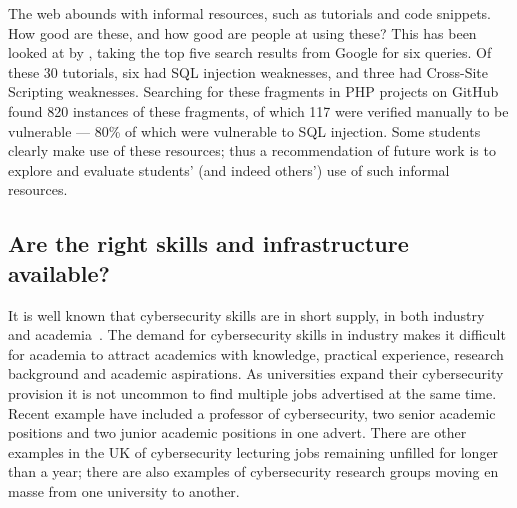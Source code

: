 \documentclass[sigconf]{acmart}
\begin{document}
The web abounds with informal resources, such as tutorials and code snippets. How good are these, and how good are people at using these? This has been looked at by \cite{Unruhetal2017a}, taking the top five search results from Google for six queries. Of these 30 tutorials, six had SQL injection weaknesses, and three had Cross-Site Scripting weaknesses. Searching for these fragments in PHP projects on GitHub found 820 instances of these fragments, of which 117 were verified manually to be vulnerable --- 80\% of which were vulnerable to SQL injection. Some students clearly make use of these resources; thus a recommendation of future work is to explore and evaluate students' (and indeed others') use of such informal resources. 

\subsection{Are the right skills and infrastructure available?}
It is well known that cybersecurity skills are in short supply, in both industry~\cite{Ackerman2019a} and academia~\cite{schneider2013}. The demand for cybersecurity skills in industry makes it difficult for academia to attract academics with knowledge, practical experience, research background and academic aspirations. As universities expand their cybersecurity provision it is not uncommon to find multiple jobs advertised at the same time. Recent example have included a professor of cybersecurity, two senior academic positions and two junior academic positions in one advert. There are other examples in the UK of cybersecurity lecturing jobs remaining unfilled for longer than a year; there are also examples of cybersecurity research groups moving en masse from one university to another.

\begin{comment}
For example, research into the state of IT conducted annually by Enterprise Strategy Group (ESG) has revealed that the skills gap in information security continues to widen and has doubled in the past five years; in 2014, 23\% of respondents to the survey stated that their organisation had a problematic shortage of information security skills -- this had climbed to 51\% at the beginning of 2018~\cite{ESG:2018}. Clearly, cybersecurity is an issue which is being felt across many industries and organisations, and is a concern which extends beyond IT leadership into the boardroom~\cite{Ackerman2019a}.


The ESG survey is international, but ESG have confirmed that the UK figures are very similar. In the UK, there has been a resurgence of job adverts to recruit academic staff with specialisms in cybersecurity over the past three years. 
\end{comment}
\end{document}
